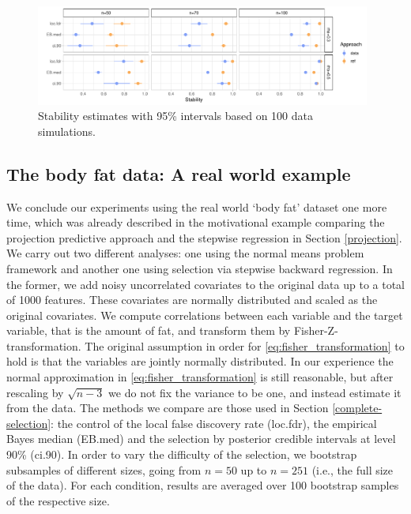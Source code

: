 \documentclass[american,]{article}
\theoremstyle{definition}
\begin{document}
\begin{figure}[tp]
  \centering
  \includegraphics[width=0.98\textwidth]{graphics/stability.pdf}
  \caption{Stability estimates with 95\% intervals based on 100 data simulations.\\}
  \label{fig:stability}
\end{figure}




\hypertarget{real-world-data}{%
\subsection{The body fat data: A real world example}\label{real-world-data}}

We conclude our experiments using the real world `body fat' dataset
one more time, which was already described in the motivational example
comparing the projection predictive approach and the stepwise
regression in Section \ref{projection}. We carry out two different
analyses: one using the normal means problem framework and another one
using selection via stepwise backward regression. In the former, we
add noisy uncorrelated covariates to the original data up to a total
of 1000 features. These covariates are normally distributed and scaled
as the original covariates. We compute correlations between each
variable and the target variable, that is the amount of fat, and
transform them by Fisher-Z-transformation. The original assumption in
order for \eqref{eq:fisher_transformation} to hold is that the
variables are jointly normally distributed. In our experience the
normal approximation in \eqref{eq:fisher_transformation} is still
reasonable, but after rescaling by $\sqrt{n-3}$ we do not fix the
variance to be one, and instead estimate it from the data. The methods
we compare are those used in Section \ref{complete-selection}: the
control of the local false discovery rate (loc.fdr), the empirical
Bayes median (EB.med) and the selection by posterior credible
intervals at level 90\% (ci.90).  In order to vary the difficulty of
the selection, we bootstrap subsamples of different sizes, going from
$n=50$ up to $n=251$ (i.e., the full size of the data). For each
condition, results are averaged over 100 bootstrap samples of the
respective size.
\end{document}
